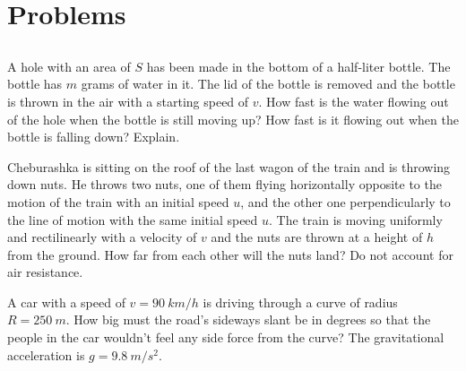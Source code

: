 \documentclass[11pt]{article}
\begin{document}
        \section{Problems}
        \toggleStatement
        \subsection{\protect{}}

\graphicspath{{../problems/}}


\probeng
A hole with an area of $S$ has been made in the bottom of a half-liter bottle. The bottle has $m$ grams of water in it. The lid of the bottle is removed and the bottle is thrown in the air with a starting speed of $v$. How fast is the water flowing out of the hole when the bottle is still moving up? How fast is it flowing out when the bottle is falling down? Explain.
\probend
\bigskip


\probeng
Cheburashka is sitting on the roof of the last wagon of the train and is throwing down nuts. He throws two nuts, one of them flying horizontally opposite to the motion of the train with an initial speed $u$, and the other one perpendicularly to the line of motion with the same initial speed $u$. The train is moving uniformly and rectilinearly with a velocity of $v$ and the nuts are thrown at a height of $h$ from the ground. How far from each other will the nuts land? Do not account for air resistance.
\probend
\bigskip


\probeng
A car with a speed of $v=\SI{90}{km/h}$ is driving through a curve of radius $R=\SI{250}{m}$. How big must the road’s sideways slant be in degrees so that the people in the car wouldn’t feel any side force from the curve? The gravitational acceleration is $g=\SI{9.8}{m/s^{2}}$.
\probend
\bigskip

\end{document}

